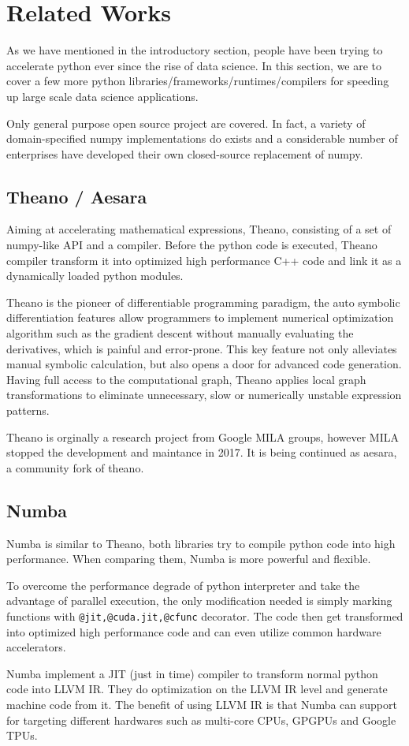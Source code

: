 \documentclass{article}
\newenvironment{newSec}[1]{
	\section{#1}
	\lhead{#1}
}{ \newpage }
\newenvironment{newSubsec}[1]{
	\subsection{#1}
}{}
\begin{document}
\begin{newSec}{Related Works}
	As we have mentioned in the introductory section, people have been trying to accelerate python ever since the rise of data science.
	In this section, we are to cover a few more python libraries/frameworks/runtimes/compilers for speeding up large scale data science applications.\par
	Only general purpose open source project are covered.
	In fact, a variety of domain-specified numpy implementations do exists and a considerable number of enterprises have developed their own closed-source replacement of numpy.
	\begin{newSubsec}{Theano / Aesara}
		Aiming at accelerating mathematical expressions, Theano\cite{theano}, consisting of a set of numpy-like API and a compiler.
		Before the python code is executed, Theano compiler transform it into optimized high performance C++ code and link it as a dynamically loaded python modules.\par
		Theano is the pioneer of differentiable programming paradigm, the auto symbolic differentiation features
		allow programmers to implement numerical optimization algorithm such as the gradient descent without manually evaluating the derivatives, which is painful and error-prone.
		This key feature not only alleviates manual symbolic calculation, but also opens a door for advanced code generation.
		Having full access to the computational graph, Theano applies local graph transformations to eliminate unnecessary, slow or numerically unstable expression patterns.\par
		Theano is orginally a research project from Google MILA groups, however MILA stopped the development and maintance in 2017.
		It is being continued as aesara, a community fork of theano.
	\end{newSubsec}

	\begin{newSubsec}{Numba}
		Numba is similar to Theano, both libraries try to compile python code into high performance. When comparing them, Numba is more powerful and flexible.\par
		To overcome the performance degrade of python interpreter and take the advantage of parallel execution,
		the only modification needed is simply marking functions with \texttt{@jit,@cuda.jit,@cfunc} decorator.
		The code then get transformed into optimized high performance code and can even utilize common hardware accelerators.\par
		Numba implement a JIT (just in time) compiler to transform normal python code into LLVM IR.
		They do optimization on the LLVM IR level and generate machine code from it.
		The benefit of using LLVM IR is that Numba can support for targeting different hardwares such as multi-core CPUs, GPGPUs and Google TPUs.
	\end{newSubsec}



\end{newSec}
\end{document}
